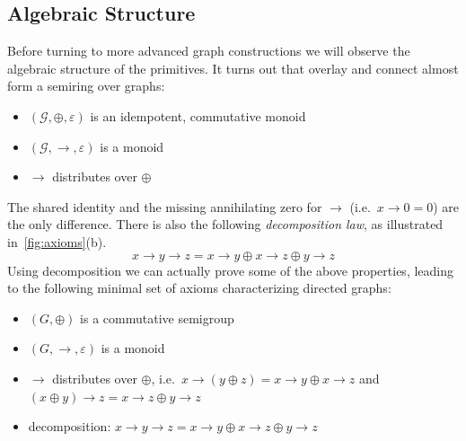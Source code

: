 \documentclass{article}
\renewcommand{\epsilon}{\varepsilon}
\newcommand{\eps}{\epsilon}
\newcommand{\overlay}{\oplus}
\newcommand{\connect}{\rightarrow}
\begin{document}
\subsection{Algebraic Structure}\label{sec:algebra}
Before turning to more advanced graph constructions we will observe the
algebraic structure of the primitives. It turns out that overlay and connect
almost form a semiring over graphs:
\begin{itemize}
\item $(\mathcal{G}, \overlay, \eps)$ is an idempotent, commutative monoid
\item $(\mathcal{G}, \connect, \eps)$ is a monoid
\item $\connect$ distributes over $\overlay$
\end{itemize}
The shared identity and the missing annihilating zero for $\connect$
(i.e.\ $x \connect 0 = 0$) are the only difference. There is also the following
\textit{decomposition law}, as illustrated in~\autoref{fig:axioms}(b).
\[
  x \connect y \connect z = x \connect y \overlay x \connect z \overlay y \connect z
\]
Using decomposition we can actually prove some of the above properties, leading
to the following minimal set of axioms characterizing directed graphs:
\begin{itemize}
\item $(G, \overlay)$ is a commutative semigroup
\item $(G, \connect, \eps)$ is a monoid
\item $\connect$ distributes over $\overlay$, i.e.\ $x \connect (y \overlay z)
  = x \connect y \overlay x \connect z$ and $(x \overlay y) \connect z = x
  \connect z \overlay y \connect z$
\item decomposition: $x \connect y \connect z = x \connect y \overlay x
  \connect z \overlay y \connect z$ 
\end{itemize}
\end{document}
